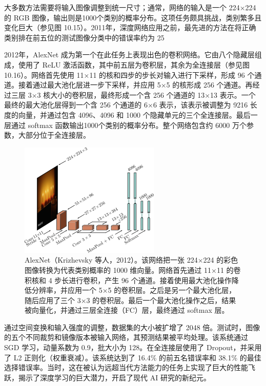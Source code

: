 大多数方法需要将输入图像调整到统一尺寸；通常，网络的输入是一个 224×224 的 RGB 图像，输出则是1000个类别的概率分布。这项任务颇具挑战，类别繁多且变化巨大（参见图 10.15）。2011年，深度网络应用之前，最先进的方法在将正确类别排在前五位的测试图像分类中的错误率约为 25%

2012年，AlexNet 成为第一个在此任务上表现出色的卷积网络。它由八个隐藏层组成，使用了 ReLU 激活函数，其中前五层为卷积层，其余为全连接层（参见图 10.16）。网络首先使用 11×11 的核和四步的步长对输入进行下采样，形成 96 个通道。接着通过最大池化层进一步下采样，并应用 5×5 的核形成 256 个通道。再经过三层 3×3 核大小的卷积层，最终形成一个含 256 个通道的 13×13 表示。一个最终的最大池化层得到一个含 256 个通道的 6×6 表示，该表示被调整为 9216 长度的向量，并通过包含 4096、4096 和 1000 个隐藏单元的三个全连接层。最后一层通过 softmax 函数输出1000个类别的概率分布。整个网络包含约 6000 万个参数，大部分位于全连接层。

\begin{figure}[ht!]
	\centering
	\includegraphics[width=0.7\linewidth]{png/chapter10/ConvAlex.png}
	\caption{AlexNet（Krizhevsky 等人，2012）。该网络把一张 224×224 的彩色图像转换为代表类别概率的 1000 维向量。网络首先通过 11×11 的卷积核和 4 步长进行卷积，产生 96 个通道。接着使用最大池化操作降低分辨率，并应用一个 5×5 的卷积层。之后是另一个最大池化层，随后应用了三个 3×3 的卷积层。最后一个最大池化操作之后，结果被向量化，并通过三层全连接（FC）层，最终通过 softmax 层。}
\end{figure}


通过空间变换和输入强度的调整，数据集的大小被扩增了 2048 倍。测试时，图像的五个不同裁剪和镜像版本被输入网络，其预测结果被平均处理。该系统通过 SGD 学习，动量系数为 0.9，批大小为 128。在全连接层使用了 Dropout，并采用了 L2 正则化（权重衰减）。该系统达到了 16.4\% 的前五名错误率和 38.1\% 的最佳选择错误率。当时，这在被认为远超当代方法能力的任务上实现了巨大的性能飞跃，揭示了深度学习的巨大潜力，开启了现代 AI 研究的新纪元。

